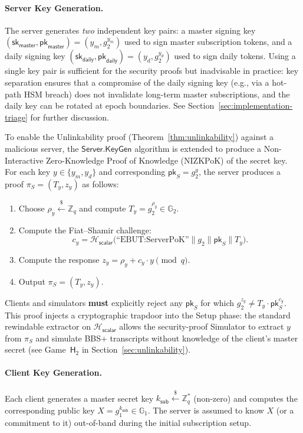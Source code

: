 \documentclass[11pt]{article}
\theoremstyle{definitionstyle}
\theoremstyle{plain}
\begin{document}
\paragraph{Server Key Generation.}
The server generates \emph{two} independent key pairs: a master signing key $(\mathsf{sk}_{\mathsf{master}}, \mathsf{pk}_{\mathsf{master}}) = (y_m, g_2^{y_m})$ used to sign master subscription tokens, and a daily signing key $(\mathsf{sk}_{\mathsf{daily}}, \mathsf{pk}_{\mathsf{daily}}) = (y_d, g_2^{y_d})$ used to sign daily tokens. Using a single key pair is sufficient for the security proofs but inadvisable in practice: key separation ensures that a compromise of the daily signing key (e.g., via a hot-path HSM breach) does not invalidate long-term master subscriptions, and the daily key can be rotated at epoch boundaries. See Section~\ref{sec:implementation-triage} for further discussion.

To enable the Unlinkability proof (Theorem~\ref{thm:unlinkability}) against a malicious server, the $\mathsf{Server.KeyGen}$ algorithm is extended to produce a Non-Interactive Zero-Knowledge Proof of Knowledge (NIZKPoK) of the secret key. For each key $y \in \{y_m, y_d\}$ and corresponding $\mathsf{pk}_S = g_2^y$, the server produces a proof $\pi_S = (T_y, z_y)$ as follows:
\begin{enumerate}[leftmargin=*,nosep]
  \item Choose $\rho_y \xleftarrow{\$} \mathbb{Z}_q$ and compute $T_y = g_2^{\rho_y} \in \mathbb{G}_2$.
  \item Compute the Fiat--Shamir challenge:
    \[
    c_y = \mathcal{H}_{\mathsf{scalar}}\!\bigl(\text{``EBUT:ServerPoK''} \parallel g_2 \parallel \mathsf{pk}_S \parallel T_y\bigr).
    \]
  \item Compute the response $z_y = \rho_y + c_y \cdot y \pmod{q}$.
  \item Output $\pi_S = (T_y, z_y)$.
\end{enumerate}
Clients and simulators \textbf{must} explicitly reject any $\mathsf{pk}_S$ for which $g_2^{z_y} \neq T_y \cdot \mathsf{pk}_S^{c_y}$. This proof injects a cryptographic trapdoor into the Setup phase: the standard rewindable extractor on $\mathcal{H}_{\mathsf{scalar}}$ allows the security-proof Simulator to extract $y$ from $\pi_S$ and simulate BBS+ transcripts without knowledge of the client's master secret (see Game~$\mathsf{H}_2$ in Section~\ref{sec:unlinkability}).

\paragraph{Client Key Generation.}
Each client generates a master secret key $k_{\mathsf{sub}} \xleftarrow{\$} \mathbb{Z}_q^*$ (non-zero) and computes the corresponding public key $X = g_1^{k_{\mathsf{sub}}} \in \mathbb{G}_1$. The server is assumed to know $X$ (or a commitment to it) out-of-band during the initial subscription setup.
\end{document}
